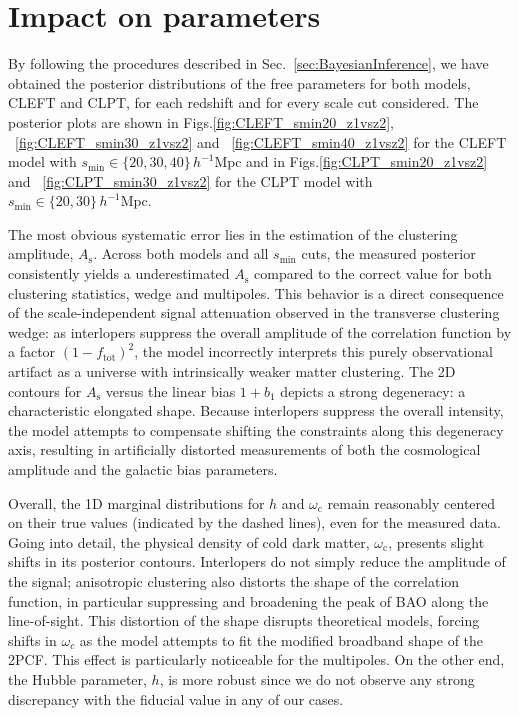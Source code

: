 \documentclass[12pt,a4paper,oneside]{report}
\begin{document}
\section{Impact on parameters}\label{sec:ImpactParamaters}
By following the procedures described in Sec.~\ref{sec:BayesianInference}, we have obtained the posterior distributions of the free parameters for both models, CLEFT and CLPT, for each redshift and for every scale cut considered. The posterior plots are shown in Figs.\ref{fig:CLEFT_smin20_z1vsz2}, ~\ref{fig:CLEFT_smin30_z1vsz2} and ~\ref{fig:CLEFT_smin40_z1vsz2} for the CLEFT model with $s_\mathrm{min} \in \{ 20,30,40 \} \,h^{-1} \mathrm{Mpc}$ and in Figs.\ref{fig:CLPT_smin20_z1vsz2} and ~\ref{fig:CLPT_smin30_z1vsz2} for the CLPT model with $s_\mathrm{min} \in \{ 20,30 \} \,h^{-1} \mathrm{Mpc}$.

The most obvious systematic error lies in the estimation of the clustering amplitude, $A_\mathrm{s}$. Across both models and all $s_\mathrm{min}$ cuts, the measured posterior consistently yields a underestimated $A_\mathrm{s}$ compared to the correct value for both clustering statistics, wedge and multipoles. This behavior is a direct consequence of the scale-independent signal attenuation observed in the transverse clustering wedge: as interlopers suppress the overall amplitude of the correlation function by a factor $(1 - f_\mathrm{tot})^2$, the model incorrectly interprets this purely observational artifact as a universe with intrinsically weaker matter clustering. The 2D contours for $A_\mathrm{s}$ versus the linear bias $1+b_1$ depicts a strong degeneracy: a characteristic elongated shape. Because interlopers suppress the overall intensity, the model attempts to compensate shifting the constraints along this degeneracy axis, resulting in artificially distorted measurements of both the cosmological amplitude and the galactic bias parameters.

Overall, the 1D marginal distributions for $h$ and $\omega_\mathrm{c}$ remain reasonably centered on their true values (indicated by the dashed lines), even for the measured data.
Going into detail, the physical density of cold dark matter, $\omega_\mathrm{c}$, presents slight shifts in its posterior contours. Interlopers do not simply reduce the amplitude of the signal; anisotropic clustering also distorts the shape of the correlation function, in particular suppressing and broadening the peak of BAO along the line-of-sight. This distortion of the shape disrupts theoretical models, forcing shifts in $\omega_c$ as the model attempts to fit the modified broadband shape of the 2PCF. This effect is particularly noticeable for the multipoles.
On the other end, the Hubble parameter, $h$, is more robust since we do not observe any strong discrepancy with the fiducial value in any of our cases.
\end{document}
